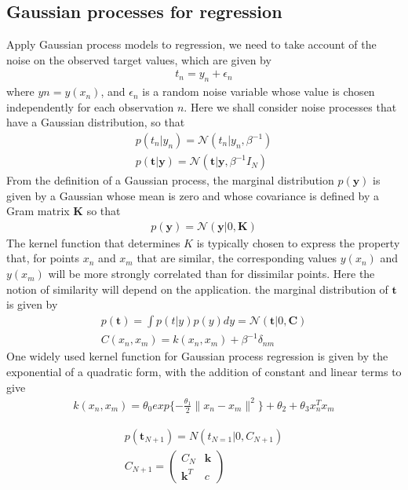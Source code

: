 \documentclass[a4paper]{article}
\begin{document}
\subsection{Gaussian processes for regression}
Apply Gaussian process models to regression, we need to take account of the noise on the observed target values, which are given by
\begin{align}
t_n = y_n + \epsilon_n
\end{align}
where $yn = y(x_n)$, and $\epsilon_n$ is a random noise variable whose
value is chosen independently for each observation $n$. Here we shall
consider noise processes that have a Gaussian distribution, so that
\begin{align}
p(t_n|y_n) =  \mathcal{N}(t_n|y_n, \beta^{-1})\\
p(\mathbf{t}|\mathbf{y}) =  \mathcal{N}(\mathbf{t}|\mathbf{y}, \beta^{-1}\mathit{I}_N)
\end{align}
From the deﬁnition of a Gaussian process, the marginal distribution
$p(\mathbf{y})$ is given by a Gaussian whose mean is zero and whose covariance is deﬁned by a Gram matrix $\mathbf{K}$ so that
\begin{align}
p(\mathbf{y}) = \mathcal{N}(\mathbf{y}|0, \mathbf{K})
\end{align}
The kernel function that determines $K$ is typically chosen to express the property that, for points $x_n$ and $x_m$ that are similar, the corresponding values $y(x_n)$ and $y(x_m)$ will be more strongly correlated than for dissimilar points. Here the notion of similarity will depend on the application. the marginal distribution of $\mathbf{t}$ is given by
\begin{align}
p(\mathbf{t}) = \int p(t|y)p(y)dy = \mathcal{N}(\mathbf{t}|0, \mathbf{C})\\
C(x_n, x_m) = k(x_n, x_m) + \beta^{-1} \delta_{nm}
\end{align}
One widely used kernel function for Gaussian process regression is given by the exponential of a quadratic form, with the addition of constant and linear terms to give
\begin{align}
k(x_n, x_m) = \theta_0 exp\{ -\frac{\theta_1}{2}\|x_n-x_m\|^2\} +
  \theta_2 + \theta_3x_n^Tx_m
\end{align}

\begin{align}
p(\mathbf{t}_{N+1}) = N(t_{N=1}|0, C_{N+1})\\
C_{N+1} =
 \begin{pmatrix}
  C_{N} & \mathbf{k}\\
  \mathbf{k}^T & c
 \end{pmatrix}
\end{align}
\end{document}
